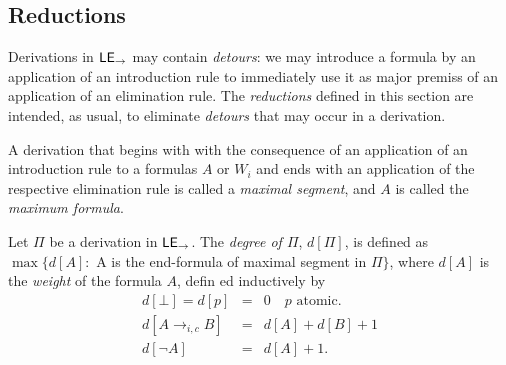\subsection{Reductions}
Derivations in $\mathsf{LE}_{\to}$ may contain \textit{detours}: we may introduce a formula by an application of an introduction rule to immediately use it as major premiss of an application of an elimination rule. The \textit{reductions} defined in this section are intended, as usual, to eliminate \textit{detours} that may occur in a derivation.


\begin{definition}
A derivation that begins with with the consequence of an application of an introduction rule to a formulas $A$ or $W_{i}$ and ends with an application of the respective elimination rule is called a {\em maximal segment}, and $A$ is called the {\em maximum formula}.
\end{definition}

\begin{definition}
Let $\Pi$ be a derivation in $\mathsf{LE}_{\to}$. The {\em degree of $\Pi$}, $d[\Pi ]$, is defined as $\max\{d[A]:$ A is the end-formula of maximal segment in $\Pi \}$, where $d[A]$ is the {\em weight} of the formula $A$, defin
ed inductively by
$$
\begin{array}{lcl}
d[\bot]=d[p] &=& 0 \quad p\mbox{ atomic.}\\
d[A \to_{i,c} B] &=& d[A] + d[B] + 1 \\
d[\neg A] &=& d[A] +1.
\end{array}
$$
\end{definition}


